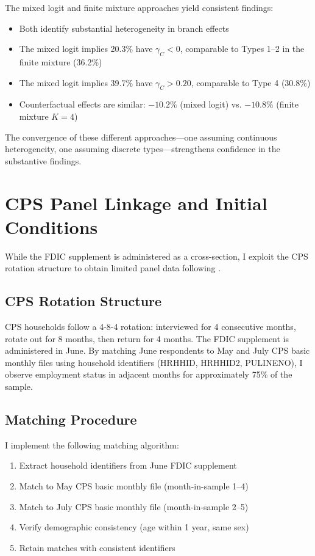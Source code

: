 \documentclass[12pt]{article}
\begin{document}
The mixed logit and finite mixture approaches yield consistent findings:
\begin{itemize}
    \item Both identify substantial heterogeneity in branch effects
    \item The mixed logit implies 20.3\% have $\gamma_C < 0$, comparable to Types 1--2 in the finite mixture (36.2\%)
    \item The mixed logit implies 39.7\% have $\gamma_C > 0.20$, comparable to Type 4 (30.8\%)
    \item Counterfactual effects are similar: $-10.2\%$ (mixed logit) vs. $-10.8\%$ (finite mixture $K=4$)
\end{itemize}

The convergence of these different approaches---one assuming continuous heterogeneity, one assuming discrete types---strengthens confidence in the substantive findings.

\section{CPS Panel Linkage and Initial Conditions}
\label{app:cps_panel}

While the FDIC supplement is administered as a cross-section, I exploit the CPS rotation structure to obtain limited panel data following \citet{goodstein2022}.

\subsection{CPS Rotation Structure}

CPS households follow a 4-8-4 rotation: interviewed for 4 consecutive months, rotate out for 8 months, then return for 4 months. The FDIC supplement is administered in June. By matching June respondents to May and July CPS basic monthly files using household identifiers (HRHHID, HRHHID2, PULINENO), I observe employment status in adjacent months for approximately 75\% of the sample.

\subsection{Matching Procedure}

I implement the following matching algorithm:
\begin{enumerate}
    \item Extract household identifiers from June FDIC supplement
    \item Match to May CPS basic monthly file (month-in-sample 1--4)
    \item Match to July CPS basic monthly file (month-in-sample 2--5)
    \item Verify demographic consistency (age within 1 year, same sex)
    \item Retain matches with consistent identifiers
\end{enumerate}
\end{document}
